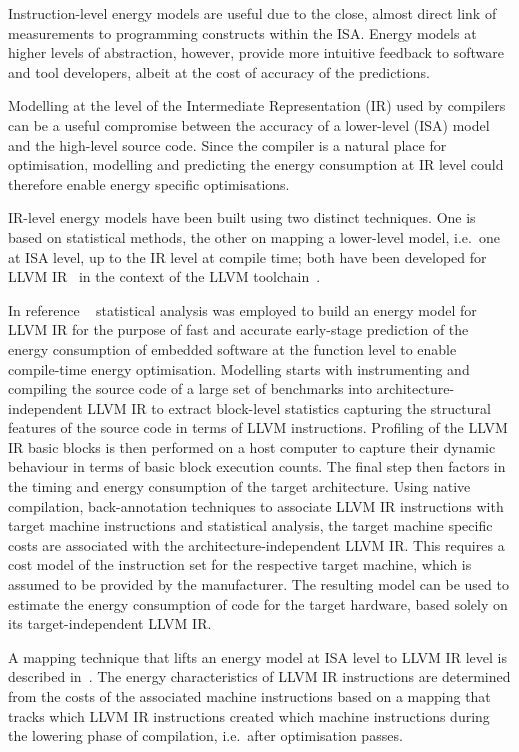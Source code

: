 Instruction-level energy models are 
useful 
due to the close, almost direct
link of measurements to programming constructs within the ISA. Energy models at
higher levels of abstraction, however, provide more intuitive feedback to
software and tool developers, 
albeit 
at the cost of accuracy of the
predictions. 

Modelling at the level of the Intermediate Representation (IR) used by
compilers can be a useful compromise between the accuracy of a lower-level
(ISA) model and the high-level source code. Since the compiler is a natural
place for optimisation, modelling and predicting the energy consumption at IR
level could therefore enable energy specific optimisations.

IR-level energy models have been built using two distinct techniques. One is
based on statistical methods, the other on mapping a lower-level model, i.e.\
one at ISA level, up to the IR level at compile time; both have been developed
for LLVM IR~\cite{LattnerLLVM2004} in the context of the LLVM
toolchain~\cite{LLVM}.

In reference ~\cite{Brandolese2011} statistical analysis was employed to build an
energy model for LLVM IR for the purpose of fast and accurate early-stage
prediction of the energy consumption of embedded software at the function level
to enable compile-time energy optimisation.
%
Modelling starts with instrumenting and compiling the source code of a large
set of benchmarks into architecture-independent LLVM IR to extract block-level
statistics capturing the structural features of the source code in terms of
LLVM instructions. 
%
Profiling of the LLVM IR basic blocks is then performed on a host computer to
capture their dynamic behaviour in terms of basic block execution counts. 
%
The final step then factors in the timing and energy consumption of the target
architecture. Using native compilation, back-annotation techniques to associate
LLVM IR instructions with target machine instructions and statistical analysis,
the target machine specific costs are associated with the
architecture-independent LLVM IR. This requires a cost model of the instruction
set for the respective target machine, which is assumed to be provided by the
manufacturer. The resulting model can be used to estimate the energy
consumption of code for the target hardware, based solely on its
target-independent LLVM IR.

A 
mapping technique that lifts an energy model at ISA level to LLVM IR
level is described in~\cite{DBLP:journals/corr/GeorgiouKE15}. The energy characteristics of LLVM IR
instructions are determined from the costs of the associated machine
instructions based on a mapping that tracks which LLVM IR instructions created
which machine instructions during the lowering phase of compilation, i.e.\
after optimisation passes. 

